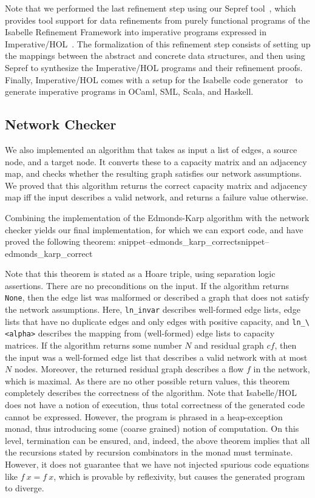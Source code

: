 \documentclass{llncs}
\newcommand{\isai}{\lstinline[language=isabelle,basicstyle=\normalsize\ttfamily\slshape]}
\newcommand{\Snippet}[1]{\ifcsname snippet--#1\endcsname\csname snippet--#1\endcsname\else\PackageError{}{No snippet '#1' defined.}{}\fi}
\begin{document}
  Note that we performed the last refinement step using our Sepref tool~\cite{La15,La16}, which provides tool support for data refinements from 
  purely functional programs of the Isabelle Refinement Framework into imperative programs expressed in Imperative/HOL~\cite{BKHEM08}.
  The formalization of this refinement step consists of setting up the mappings between the abstract and concrete data structures,
  and then using Sepref to synthesize the Imperative/HOL programs and their refinement proofs.
  Finally, Imperative/HOL comes with a setup for the Isabelle code generator~\cite{Haft09,HaNi10} to generate imperative programs in OCaml, SML, Scala, and Haskell.

  \subsection{Network Checker}
  We also implemented an algorithm that takes as input a list of edges, a source node, and a target node.
  It converts these to a capacity matrix and an adjacency map, and checks whether the resulting graph satisfies our network assumptions.
  We proved that this algorithm returns the correct capacity matrix and adjacency map iff the input describes a valid network,
  and returns a failure value otherwise.
    
  Combining the implementation of the Edmonds-Karp algorithm with the network checker yields our final implementation,
  for which we can export code, and have proved the following theorem: 
  \Snippet{edmonds_karp_correct}
  Note that this theorem is stated as a Hoare triple, using separation logic assertions. There are no preconditions on the input.
  If the algorithm returns \isai{None}, then the edge list was malformed or described a graph that does not satisfy the network assumptions.
  Here, \isai{ln_invar} describes well-formed edge lists, \ie edge lists that have no duplicate edges and only edges with positive capacity,
  and \isai{ln_\<alpha>} describes the mapping from (well-formed) edge lists to capacity matrices.
  If the algorithm returns some number $N$ and residual graph $cf$, then the input was a well-formed edge list that describes a valid network with at most $N$ nodes.
  Moreover, the returned residual graph describes a flow $f$ in the network, which is maximal. 
  As there are no other possible return values, this theorem completely describes the correctness of the algorithm. 
  Note that Isabelle/HOL does not have a notion of execution, thus total correctness of the generated code cannot be expressed. However, the program is phrased in a heap-exception monad, thus introducing some (coarse grained) notion of
  computation. On this level, termination can be ensured, and, indeed, the above theorem implies that all the recursions stated by recursion 
  combinators in the monad must terminate. However, it does not guarantee that we have not injected spurious code equations like $f~x = f~x$, 
  which is provable by reflexivity, but causes the generated program to diverge.
\end{document}
